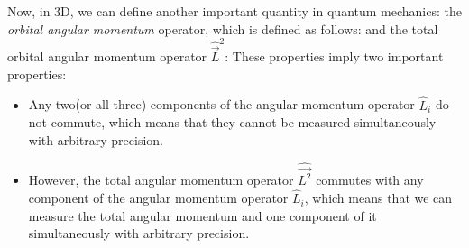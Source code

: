 Now, in 3D, we can define another important quantity in quantum mechanics: the \emph{orbital angular momentum} operator, which is defined as follows:
and the total orbital angular momentum operator $\hat{\vec{L}}^2$:
These properties imply two important properties:
\begin{itemize}
  \item Any two(or all three) components of the angular momentum operator $\hat{L}_i$ do not commute, which means that they cannot be measured simultaneously with arbitrary precision.
  \item However, the total angular momentum operator $\hat{\vec{L^2}}$ commutes with any component of the angular momentum operator $\hat{L}_i$, which means that we can measure the total angular momentum and one component of it simultaneously with arbitrary precision.
\end{itemize}

